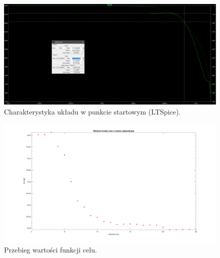 \documentclass{article}
\begin{document}
\clearpage
\pagebreak
\begin{landscape}
	\begin{figure}[h]
		\vspace*{-2cm}
		\includegraphics[width=20cm,height=10 cm]{graphics/starting_point_spice.png}
		\centering
		\caption{Charakterystyka układu w punkcie startowym (LTSpice).}
	\end{figure}
\end{landscape}

\pagebreak
\begin{landscape}
	\begin{figure}[h]
		\vspace*{-2cm}
		\includegraphics[width=25cm,height=15 cm]{graphics/fval.png}
		\centering
		\caption{Przebieg wartości funkcji celu.}
	\end{figure}
\end{landscape}
\end{document}
